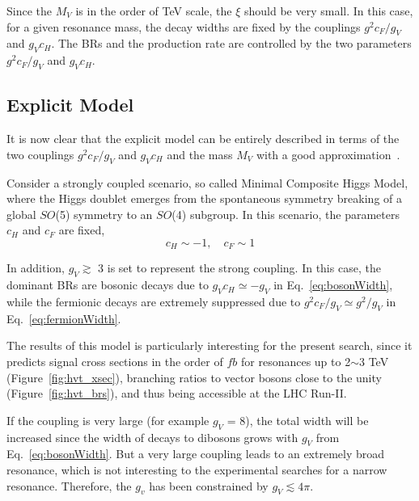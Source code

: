 Since the $M_V$ is in the order of TeV scale, the $\xi$ should be very small. In this case, for a given resonance mass, the decay widths are fixed by the couplings $g^2c_F/g_V$ and $g_Vc_H$. The BRs and the production rate are controlled by the two parameters $g^2c_F/g_V$ and $g_Vc_H$.



\subsection{Explicit Model} \label{sec:modelb}

It is now clear that the explicit model can be entirely described in terms of the two couplings $g^2c_F/g_V$ and $g_Vc_H$ and the mass $M_V$ with a good approximation~\cite{Pappadopulo:2014qza}.

Consider a strongly coupled scenario, so called Minimal Composite Higgs Model, where the Higgs doublet emerges from the spontaneous symmetry breaking of a global $SO$(5) symmetry to an $SO$(4) subgroup. In this scenario, the parameters $c_H$ and $c_F$ are fixed, \[c_H \sim -1, \quad c_F \sim 1\]

In addition, $g_V \gtrsim$ 3 is set to represent the strong coupling. In this case, the dominant BRs are bosonic decays due to $g_Vc_H \simeq -g_V$ in Eq.~\ref{eq:bosonWidth}, while the fermionic decays are extremely suppressed due to $g^2c_F/g_V \simeq g^2/g_V$ in Eq.~\ref{eq:fermionWidth}.

The results of this model is particularly interesting for the present search, since it predicts signal cross sections in the order of $fb$ for resonances up to 2$\sim$3 TeV (Figure~\ref{fig:hvt_xsec}), branching ratios to vector bosons close to the unity (Figure~\ref{fig:hvt_brs}), and thus being accessible at the LHC Run-II.

If the coupling is very large (for example $g_V$ = 8), the total width will be increased since the width of decays to dibosons grows with $g_V$ from Eq.~\ref{eq:bosonWidth}. But a very large coupling leads to an extremely broad resonance, which is not interesting to the experimental searches for a narrow resonance. Therefore, the $g_v$ has been constrained by $g_V \lesssim 4\pi$.

